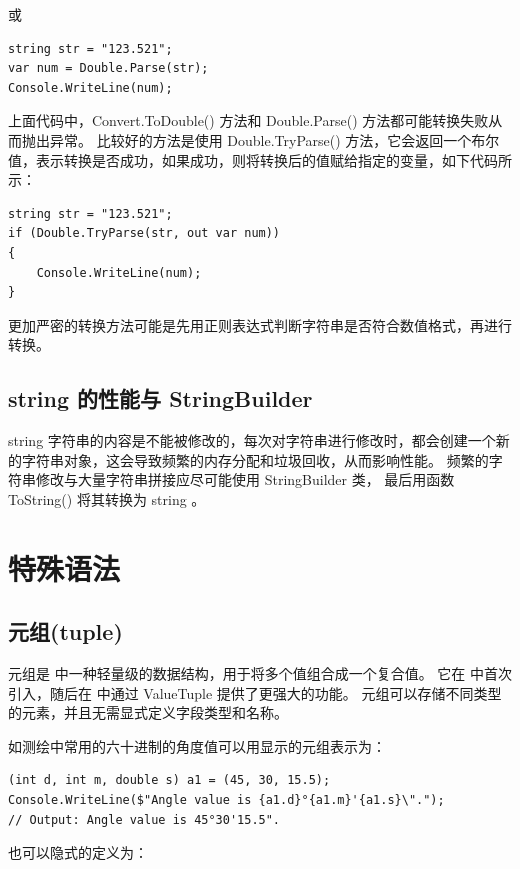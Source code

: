 或

\begin{lstlisting}
string str = "123.521";
var num = Double.Parse(str);
Console.WriteLine(num);
\end{lstlisting}

上面代码中，Convert.ToDouble() 方法和 Double.Parse() 方法都可能转换失败从而抛出异常。
比较好的方法是使用 Double.TryParse() 方法，它会返回一个布尔值，表示转换是否成功，如果成功，则将转换后的值赋给指定的变量，如下代码所示：

\begin{lstlisting}
string str = "123.521";
if (Double.TryParse(str, out var num))
{
    Console.WriteLine(num);
}
\end{lstlisting}

更加严密的转换方法可能是先用正则表达式判断字符串是否符合数值格式，再进行转换。

\subsection{ string 的性能与 StringBuilder}

string 字符串的内容是不能被修改的，每次对字符串进行修改时，都会创建一个新的字符串对象，这会导致频繁的内存分配和垃圾回收，从而影响性能。 频繁的字符串修改与大量字符串拼接应尽可能使用
StringBuilder 类， 最后用函数 ToString() 将其转换为 string 。

\section{ \cs 特殊语法}

\subsection{元组(tuple)}

元组是 \cs 中一种轻量级的数据结构，用于将多个值组合成一个复合值。
它在  中首次引入，随后在  中通过 ValueTuple 提供了更强大的功能。
元组可以存储不同类型的元素，并且无需显式定义字段类型和名称。

如测绘中常用的六十进制的角度值可以用显示的元组表示为：

\begin{lstlisting}
(int d, int m, double s) a1 = (45, 30, 15.5);
Console.WriteLine($"Angle value is {a1.d}°{a1.m}'{a1.s}\".");
// Output: Angle value is 45°30'15.5".
\end{lstlisting}

也可以隐式的定义为：

